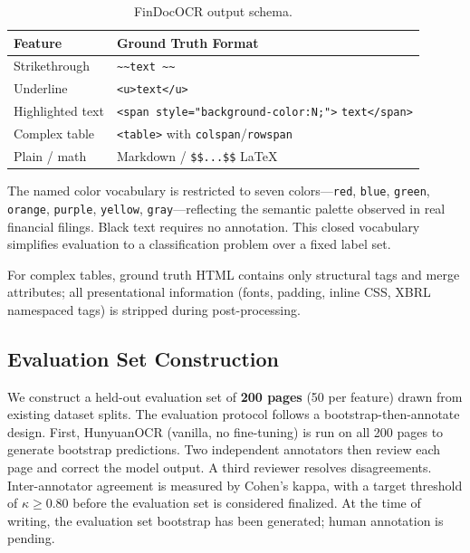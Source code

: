 \documentclass[10pt,twocolumn]{article}
\begin{document}
\begin{table}[t]
  \centering
  \caption{FinDocOCR output schema.}
  \label{tab:schema}
  \footnotesize
  \begin{tabularx}{\columnwidth}{lX}
    \toprule
    Feature       & Ground Truth Format \\
    \midrule
    Strikethrough & \texttt{\textasciitilde\textasciitilde{}text%
                    \textasciitilde\textasciitilde} \\
    Underline     & \texttt{<u>text</u>} \\
    Highlighted text & \texttt{<span style="background-color:N;">}\newline
                       \texttt{text</span>} \\
    Complex table & \texttt{<table>} with \texttt{colspan}/\texttt{rowspan} \\
    Plain / math  & Markdown / \texttt{\$\$...\$\$} LaTeX \\
    \bottomrule
  \end{tabularx}
\end{table}

The named color vocabulary is restricted to seven colors---\texttt{red},
\texttt{blue}, \texttt{green}, \texttt{orange}, \texttt{purple}, \texttt{yellow},
\texttt{gray}---reflecting the semantic palette observed in real financial filings.
Black text requires no annotation. This closed vocabulary simplifies evaluation
to a classification problem over a fixed label set.

For complex tables, ground truth HTML contains only structural tags and merge
attributes; all presentational information (fonts, padding, inline CSS, XBRL
namespaced tags) is stripped during post-processing.

\subsection{Evaluation Set Construction}
\label{sec:dataset:eval}

We construct a held-out evaluation set of \textbf{200 pages} (50 per feature)
drawn from existing dataset splits. The evaluation protocol follows a
bootstrap-then-annotate design. First, HunyuanOCR (vanilla, no fine-tuning) is
run on all 200 pages to generate bootstrap predictions. Two independent annotators
then review each page and correct the model output. A third reviewer resolves
disagreements. Inter-annotator agreement is measured by Cohen's kappa, with a
target threshold of $\kappa \geq 0.80$ before the evaluation set is considered
finalized. At the time of writing, the evaluation set bootstrap has been
generated; human annotation is pending.
\end{document}
